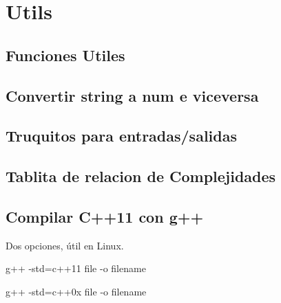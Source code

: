\section{Utils}
\subsection{Funciones Utiles}

\subsection{Convertir string a num e viceversa}

\subsection{Truquitos para entradas/salidas}

\subsection{Tablita de relacion de Complejidades}

\subsection{Compilar C++11 con g++}
Dos opciones, útil en Linux.
\begin{code}
g++ -std=c++11 {file} -o {filename}

g++ -std=c++0x {file} -o {filename}
\end{code}
